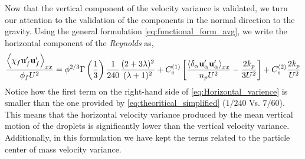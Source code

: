 Now that the vertical component of the velocity variance is validated, we turn our attention to the validation of the components in the normal direction to the gravity. 
Using the general formulation \ref{eq:functional_form_avg}, we write the horizontal component of the \textit{Reynolds} as, 
\begin{equation}
    \frac{\avg{\chi_f \textbf{u}_f'\textbf{u}_f'}_{xx}}{\phi_f U^2}
    = \phi^{2/3}\Gamma\left(\frac{1}{3}\right) \frac{1}{240}\frac{(2+3\lambda)^2 }{(\lambda+1)^2}
    + 
    C^{(1)}_e \left[
    \frac{\pavg{\textbf{u}_\alpha'\textbf{u}_\alpha'}_{xx}}{n_p U^2}
    - \frac{2k_p}{3U^2}  
    \right]
    + C^{(2)}_e
    \frac{2k_p}{U^2}  
    \label{eq:Horizontal_varience}
\end{equation}
Notice how the first term on the right-hand side of \ref{eq:Horizontal_varience} is smaller than the one provided by \ref{eq:theoritical_simplified} ($1/240$ Vs. $7/60$). 
This means that the horizontal velocity variance produced by the mean vertical motion of the droplets is significantly lower than the vertical velocity variance. 
Additionally, in this formulation we have kept the terms related to the particle center of mass velocity variance. 


